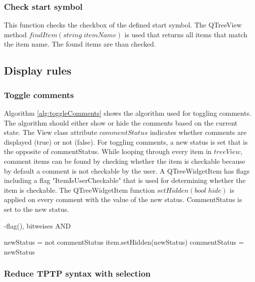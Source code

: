 \subsubsection{Check start symbol}\label{sec:ImplementationGUIStartsymbol}

This function checks the checkbox of the defined start symbol. The QTreeView method $findItem(string\; itemName)$ is used that returns all items that match the item name. 
The found items are than checked.

\subsection{Display rules}\label{sec:ImplementationGUIDisplayRules}

\subsubsection{Toggle comments}\label{sec:ImplementationGUIToggleComments}

Algorithm \ref{alg:toggleComments} shows the algorithm used for toggling comments. The algorithm should either show or hide the comments based on the current state. 
The View class attribute $commentStatus$ indicates whether comments are displayed (true) or not (false). For toggling comments, a new status is set that is the opposite of commentStatus. While looping through every item in $treeView$, comment items can be found by checking whether the item is checkable because by default a comment is not checkable by the user. A QTreeWidgetItem has flags including a flag "ItemIsUserCheckable" that is used for determining whether the item is checkable. The QTreeWidgetItem function $setHidden(bool\;hide)$ is applied on every comment with the value of the new status. CommentStatus is set to the new status. 

-flag(), bitweises AND 

\begin{algorithm}[H]
\caption{GUI Algorithm: toggle\textunderscore comments}
\label{alg:toggleComments}
\begin{algorithmic}[1] 
\State newStatus = not commentStatus
		\State item.setHidden(newStatus)
	\EndIf
\EndFor
\State commentStatus = newStatus
\end{algorithmic}
\end{algorithm}

\subsubsection{Reduce \ac{TPTP} syntax with selection}\label{sec:ImplementationGUIReduceWithSelection}

